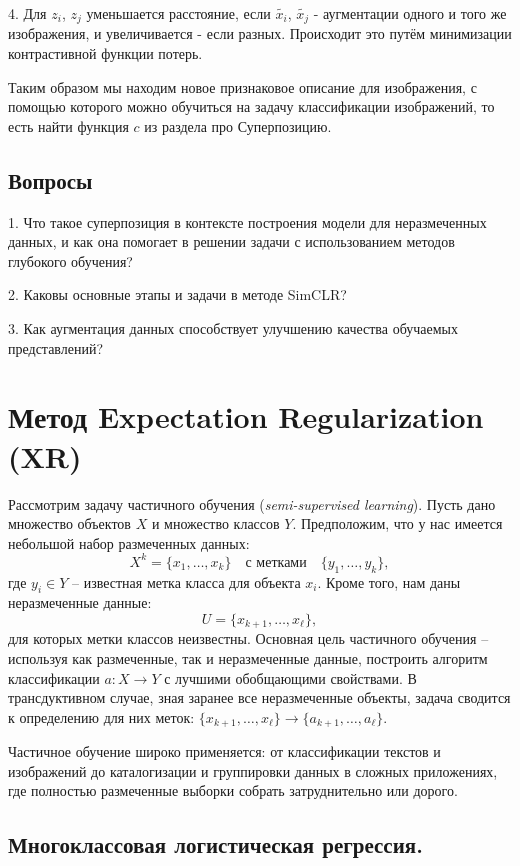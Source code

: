 4. Для $z_i$, $z_j$ уменьшается расстояние, если $\tilde{x_i}$, $\tilde{x_j}$ - аугментации одного и того же изображения, и увеличивается - если разных. Происходит это путём минимизации контрастивной функции потерь.

Таким образом мы находим новое признаковое описание для изображения, с помощью которого можно обучиться на задачу классификации изображений, то есть найти функция $c$ из раздела про Суперпозицию.

\subsection{Вопросы}
\hspace{2em}1. Что такое суперпозиция в контексте построения модели для неразмеченных данных, и как она помогает в решении задачи с использованием методов глубокого обучения?

2. Каковы основные этапы и задачи в методе SimCLR?

3. Как аугментация данных способствует улучшению качества обучаемых представлений?

\section{Метод Expectation Regularization (XR)}

Рассмотрим задачу частичного обучения (\textit{semi-supervised learning}). Пусть дано множество объектов $X$ и множество классов $Y$. Предположим, что у нас имеется небольшой набор размеченных данных:
\[
    X^k = \{ x_1, \ldots, x_k \} \quad \text{с метками} \quad \{y_1, \ldots, y_k\},
\]
где $y_i \in Y$ – известная метка класса для объекта $x_i$. Кроме того, нам даны неразмеченные данные:
\[
    U = \{x_{k+1}, \ldots, x_{\ell}\},
\]
для которых метки классов неизвестны. Основная цель частичного обучения – используя как размеченные, так и неразмеченные данные, построить алгоритм классификации $a: X \rightarrow Y$ с лучшими обобщающими свойствами. В трансдуктивном случае, зная заранее все неразмеченные объекты, задача сводится к определению для них меток: $\{x_{k+1}, \ldots, x_{\ell}\} \rightarrow \{a_{k+1}, \ldots, a_{\ell}\}$.

Частичное обучение широко применяется: от классификации текстов и изображений до каталогизации и группировки данных в сложных приложениях, где полностью размеченные выборки собрать затруднительно или дорого.

\subsection{Многоклассовая логистическая регрессия.}

